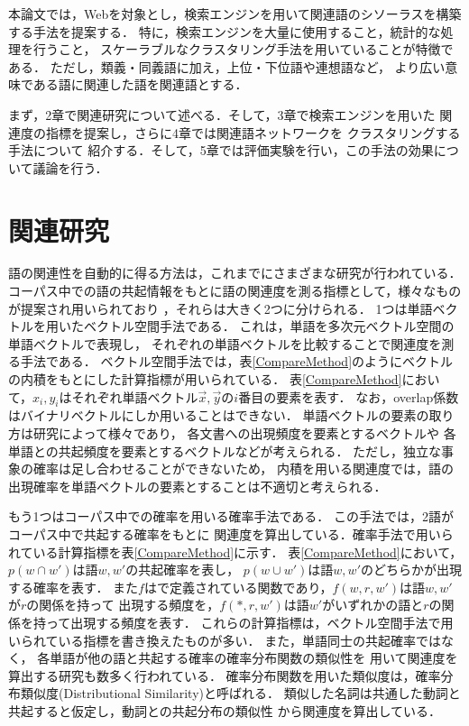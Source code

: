 \documentclass[japanese]{jnlp_1.3a}
\begin{document}
本論文では，Webを対象とし，検索エンジンを用いて関連語のシソーラスを構築する手法を提案する．
特に，検索エンジンを大量に使用すること，統計的な処理を行うこと，
スケーラブルなクラスタリング手法を用いていることが特徴である．
ただし，類義・同義語に加え，上位・下位語や連想語など，
より広い意味である語に関連した語を関連語とする．


まず，2章で関連研究について述べる．そして，3章で検索エンジンを用いた
関連度の指標を提案し，さらに4章では関連語ネットワークを
クラスタリングする手法について
紹介する．そして，5章では評価実験を行い，この手法の効果について議論を行う．

\section{関連研究}


語の関連性を自動的に得る方法は，これまでにさまざまな研究が行われている．
コーパス中での語の共起情報をもとに語の関連度を測る指標として，様々なものが提案され用いられており
\cite{Church90,Wettler93,Croft99,Curran02-2}，それらは大きく2つに分けられる．
1つは単語ベクトルを用いたベクトル空間手法である．
これは，単語を多次元ベクトル空間の単語ベクトルで表現し，
それぞれの単語ベクトルを比較することで関連度を測る手法である．
ベクトル空間手法では，表\ref{CompareMethod}のようにベクトルの内積をもとにした計算指標が用いられている．
表\ref{CompareMethod}において，$x_i,y_i$はそれぞれ単語ベクトル$\vec{x},\vec{y}$の$i$番目の要素を表す．
なお，overlap係数はバイナリベクトルにしか用いることはできない．
単語ベクトルの要素の取り方は研究によって様々であり，
各文書への出現頻度を要素とするベクトルや
各単語との共起頻度を要素とするベクトルなどが考えられる．
ただし，独立な事象の確率は足し合わせることができないため，
内積を用いる関連度では，語の出現確率を単語ベクトルの要素とすることは不適切と考えられる．


もう1つはコーパス中での確率を用いる確率手法である．
この手法では，2語がコーパス中で共起する確率をもとに
関連度を算出している．確率手法で用いられている計算指標を表\ref{CompareMethod}に示す．
表\ref{CompareMethod}において，$p(w \cap w')$は語$w,w'$の共起確率を表し，
$p(w \cup w')$は語$w,w'$のどちらかが出現する確率を表す．
また$f$は\cite{Lin98a}で定義されている関数であり，$f(w,r,w')$は語$w,w'$が$r$の関係を持って
出現する頻度を，$f(*,r,w')$は語$w'$がいずれかの語と$r$の関係を持って出現する頻度を表す．
これらの計算指標は，ベクトル空間手法で用いられている指標を書き換えたものが多い．
また，単語同士の共起確率ではなく，
各単語が他の語と共起する確率の確率分布関数の類似性を
用いて関連度を算出する研究も数多く行われている\cite{Brown92,Baker98,Slonim00}．
確率分布関数を用いた類似度は，確率分布類似度(Distributional Similarity)と呼ばれる．
類似した名詞は共通した動詞と共起すると仮定し，動詞との共起分布の類似性
から関連度を算出している．
\end{document}
